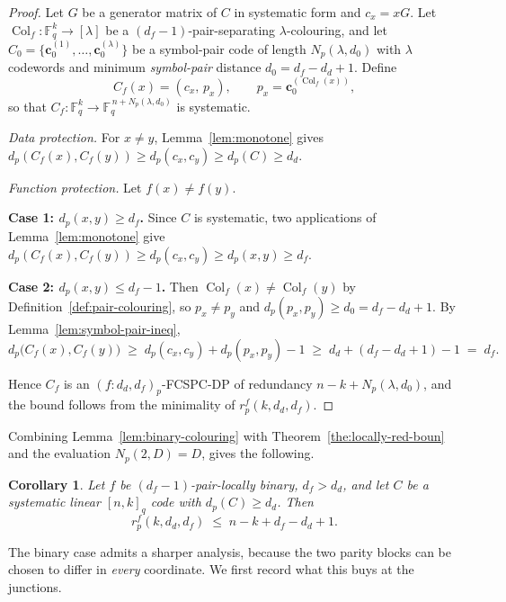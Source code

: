 \documentclass[11pt,draftclsnofoot,journal,onecolumn]{IEEEtran}
\newtheorem{corollary}{Corollary}
\begin{document}
    \begin{proof}
    Let $G$ be a generator matrix of $C$ in systematic form and $c_x = xG$. Let $\operatorname{Col}_f : \mathbb{F}_q^k \to [\lambda]$ be a $(d_f-1)$-pair-separating $\lambda$-colouring, and let $C_0 = \{\mathbf{c}_0^{(1)},\dots,\mathbf{c}_0^{(\lambda)}\}$ be a symbol-pair code of length $N_p(\lambda, d_0)$ with $\lambda$ codewords and minimum \emph{symbol-pair} distance $d_0 = d_f - d_d + 1$. Define
    \[
    C_f(x) = (c_x,\, p_x), \qquad p_x = \mathbf{c}_0^{(\operatorname{Col}_f(x))},
    \]
    so that $C_f : \mathbb{F}_q^k \to \mathbb{F}_q^{\,n + N_p(\lambda,d_0)}$ is systematic.

    \emph{Data protection.} For $x \neq y$, Lemma~\ref{lem:monotone} gives $d_p(C_f(x),C_f(y)) \ge d_p(c_x,c_y) \ge d_p(C) \ge d_d$.

    \emph{Function protection.} Let $f(x) \neq f(y)$.

    \textbf{Case 1: $d_p(x,y) \ge d_f$.} Since $C$ is systematic, two applications of Lemma~\ref{lem:monotone} give $d_p(C_f(x),C_f(y)) \ge d_p(c_x,c_y) \ge d_p(x,y) \ge d_f$.

    \textbf{Case 2: $d_p(x,y) \le d_f - 1$.} Then $\operatorname{Col}_f(x) \neq \operatorname{Col}_f(y)$ by Definition~\ref{def:pair-colouring}, so $p_x \neq p_y$ and $d_p(p_x,p_y) \ge d_0 = d_f - d_d + 1$. By Lemma~\ref{lem:symbol-pair-ineq},
    \[
    d_p\bigl(C_f(x),C_f(y)\bigr)
    \;\ge\; d_p(c_x,c_y) + d_p(p_x,p_y) - 1
    \;\ge\; d_d + (d_f - d_d + 1) - 1 \;=\; d_f .
    \]

    Hence $C_f$ is an $(f : d_d, d_f)_p$-FCSPC-DP of redundancy $n - k + N_p(\lambda, d_0)$, and the bound follows from the minimality of $r_p^f(k,d_d,d_f)$.
    \end{proof}


    Combining Lemma~\ref{lem:binary-colouring} with Theorem~\ref{the:locally-red-boun} and the evaluation $N_p(2,D) = D$, gives the following.

    \begin{corollary}
    \label{cor:binary-generic}
    Let $f$ be $(d_f-1)$-pair-locally binary, $d_f > d_d$, and let $C$ be a systematic linear $[n,k]_q$ code with $d_p(C) \ge d_d$. Then
    \[
    r_p^f(k, d_d, d_f) \;\le\; n - k + d_f - d_d + 1 .
    \]
    \end{corollary}

    The binary case admits a sharper analysis, because the two parity blocks can be chosen to differ in \emph{every} coordinate. We first record what this buys at the junctions.
\end{document}
